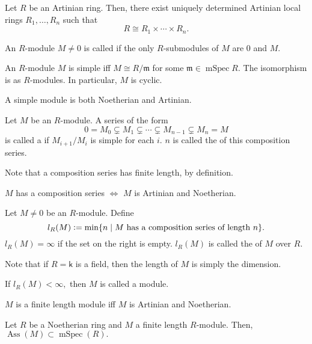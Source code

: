 \documentclass[12pt]{article}	%
\DeclareMathOperator{\Ass}{Ass}
\DeclareMathOperator{\mSpec}{mSpec}
\begin{document}
\begin{thm}
	Let $R$ be an Artinian ring. Then, there exist uniquely determined Artinian local rings $R_1, \ldots, R_n$ such that
	\begin{equation*} 
		R \cong R_1 \times \cdots \times R_n.
	\end{equation*}
\end{thm}

\begin{defn}%
	An $R$-module $M \neq 0$ is called  if the only $R$-submodules of $M$ are $0$ and $M.$
\end{defn}
\begin{prop}
	An $R$-module $M$ is simple iff $M \cong R/\mathfrak{m}$ for some $\mathfrak{m} \in \mSpec R.$ The isomorphism is as $R$-modules. In particular, $M$ is cyclic.
\end{prop}
\begin{lem} 
	A simple module is both Noetherian and Artinian.
\end{lem}

\begin{defn}%
	Let $M$ be an $R$-module. A series of the form
	\begin{equation*} 
		0 = M_0 \subsetneq M_1 \subsetneq \cdots \subsetneq M_{n-1} \subsetneq M_n = M
	\end{equation*}
	is called a  if $M_{i + 1}/M_i$ is simple for each $i.$ $n$ is called the  of this composition series.
\end{defn}
Note that a composition series has finite length, by definition.

\begin{thm}
	$M$ has a composition series $\iff$ $M$ is Artinian and Noetherian.
\end{thm}

\begin{defn}
	Let $M \neq 0$ be an $R$-module. Define
	\begin{equation*} 
		l_R(M) \vcentcolon= \min \{n \mid M \text{ has a composition series of length }n\}.
	\end{equation*}
	$l_R(M) = \infty$ if the set on the right is empty. $l_R(M)$ is called the  of $M$ over $R.$
\end{defn}
Note that if $R = \mathsf{k}$ is a field, then the length of $M$ is simply the dimension.
\begin{defn}%
	If $l_R(M) < \infty,$ then $M$ is called a  module.
\end{defn}
\begin{prop}
	$M$ is a finite length module iff $M$ is Artinian and Noetherian.
\end{prop}
\begin{prop}
	Let $R$ be a Noetherian ring and $M$ a finite length $R$-module. Then, $\Ass(M) \subset \mSpec(R).$
\end{prop}
\end{document}
